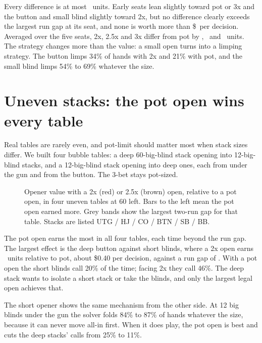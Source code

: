 \documentclass[10pt]{article}
\begin{document}
Every difference is at most \EqLargest\ units. Early seats lean slightly toward pot or 3x and the
button and small blind slightly toward 2x, but no difference clearly exceeds the largest run gap at
its seat, and none is worth more than \$\EqLargestDollars\ per decision. Averaged over the five seats, 2x, 2.5x and 3x differ
from pot by \EqAvgTwo, \EqAvgTwoFive\ and \EqAvgThree\ units. The strategy changes more than the
value: a small open turns into a limping strategy. The button limps 34\% of hands with 2x and 21\%
with pot, and the small blind limps 54\% to 69\% whatever the size.

\section{Uneven stacks: the pot open wins every table}
Real tables are rarely even, and pot-limit should matter most when stack sizes differ. We built four
bubble tables: a deep 60-big-blind stack opening into 12-big-blind stacks, and a 12-big-blind stack
opening into deep ones, each from under the gun and from the button. The 3-bet stays pot-sized.

\begin{figure}[H]
\centering

\caption{Opener value with a 2x (red) or 2.5x (brown) open, relative to a pot open, in four uneven
tables at 60 left. Bars to the left mean the pot open earned more. Grey bands show the largest
two-run gap for that table. Stacks are listed UTG / HJ / CO / BTN / SB / BB.}
\label{fig:uneven}
\end{figure}

\begin{table}[H]
\centering\small
\caption{Uneven stacks: opener value relative to a pot open, the two-run gap, the opener's raise,
limp and fold frequency, and how often the players facing the open call.}
\label{tab:uneven}

\end{table}

The pot open earns the most in all four tables, each time beyond the run gap. The largest effect is
the deep button against short blinds, where a 2x open earns \TwoATwo\ units relative to pot, about \$0.40 per
decision, against a run gap of \GapATwo. With a pot open the short blinds call 20\% of the time; facing
2x they call 46\%. The deep stack wants to isolate a short stack or take the blinds, and only the
largest legal open achieves that.

The short opener shows the same mechanism from the other side. At 12 big blinds under the gun the
solver folds 84\% to 87\% of hands whatever the size, because it can never move all-in first. When it
does play, the pot open is best and cuts the deep stacks' calls from 25\% to 11\%.
\end{document}
